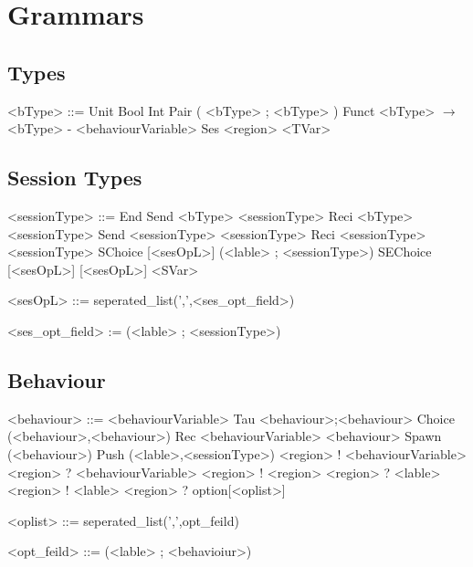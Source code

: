 \documentclass[12pt]{article}
\begin{document}
\maketitle

\section {Grammars}

\subsection{Types}

\begin{grammar}

<bType> ::= Unit
\alt Bool
\alt Int
\alt Pair ( <bType> ; <bType> )
\alt Funct <bType> $\rightarrow$ <bType> - <behaviourVariable>
\alt Ses <region>
\alt <TVar>

\end{grammar}

\subsection{Session Types}

\begin{grammar}

<sessionType> ::= End
\alt Send <bType> <sessionType>
\alt Reci <bType> <sessionType>
\alt Send <sessionType> <sessionType>
\alt Reci <sessionType> <sessionType>
\alt SChoice [<sesOpL>] (<lable> ; <sessionType>)
\alt SEChoice [<sesOpL>] [<sesOpL>]
\alt <SVar>

<sesOpL> ::= seperated_list(',',<ses_opt_field>)

<ses_opt_field> := (<lable> ; <sessionType>)

\end{grammar}

\subsection{Behaviour}

\begin{grammar}

<behaviour> ::= <behaviourVariable>
\alt Tau
\alt <behaviour>;<behaviour>
\alt Choice (<behaviour>,<behaviour>)
\alt Rec <behaviourVariable> <behaviour>
\alt Spawn (<behaviour>)
\alt Push (<lable>,<sessionType>)
\alt <region> ! <behaviourVariable>
\alt <region> ? <behaviourVariable>
\alt <region> ! <region>
\alt <region> ? <lable>
\alt <region> ! <lable>
\alt <region> ? option[<oplist>]

<oplist> ::= seperated_list(',',opt_feild)

<opt_feild> ::= (<lable> ; <behavioiur>)

\end{grammar}
\end{document}
